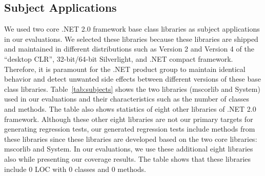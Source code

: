 \subsection{Subject Applications}

We used two core .NET 2.0 framework base class libraries as subject applications in our evaluations. We selected these libraries because these libraries are shipped and maintained in different distributions such as Version 2 and Version 4 of the ``desktop CLR'', 32-bit/64-bit Silverlight, and .NET compact framework. Therefore, it is paramount for the .NET product group to maintain identical behavior and detect unwanted side effects between different versions of these base class libraries. Table~\ref{tab:subjects} shows the two libraries (mscorlib and System) used in our evaluations and their characteristics such as the number of classes and methods. The table also shows statistics of eight other libraries of .NET 2.0 framework. Although these other eight libraries are not our primary targets for generating regression tests, our generated regression tests include methods from these libraries since these libraries are developed based on the two core libraries: mscorlib and System. In our evaluations, we use these additional eight libraries also while presenting our coverage results. The table shows that these libraries include $0$ LOC with $0$ classes and $0$ methods.

